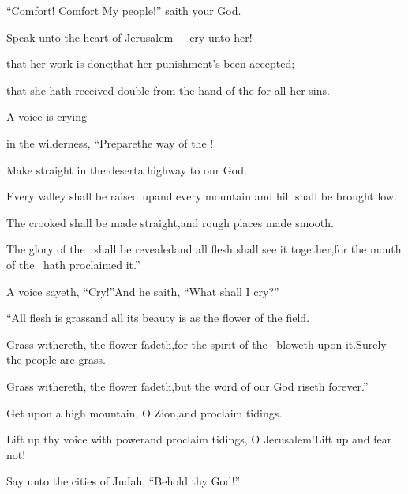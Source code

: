 
\begin{inparaenum}
  \pa{} ``Comfort! Comfort My people!''%
  \pa{}saith your God.%

  \pa{} Speak unto the heart of Jerusalem~---\pa{}cry unto her!~---%

  \pa{}that her work is done;\pa{}that her punishment's been accepted;%

  \pa{}that she hath received double from the hand of the \lord\pa{}for all her sins.%

  \pb{} A voice is crying%

  \pb{}in the wilderness, ``Prepare\pa{}the way of the \lord!%

  \pb{}Make straight in the desert\pa{}a highway to our God.%

  \pb{} Every valley shall be raised up\pa{}and every mountain and hill shall be brought low.%

  \pb{}The crooked shall be made straight,\pa{}and rough places made smooth.%

  \pb{} The glory of the \lord\ shall be revealed\pa{}and all flesh shall see it together,\pa{}for the mouth of the \lord\ hath proclaimed it.''%

  \pa{} A voice sayeth, ``Cry!''\pa{}And he saith, ``What shall I cry?''%

  \pa{}``All flesh is grass\pa{}and all its beauty is as the flower of the field.%

  \pa{} Grass withereth, the flower fadeth,\pa{}for the spirit of the \lord\ bloweth upon it.\pa{}Surely the people are grass.%

  \pa{} Grass withereth, the flower fadeth,\pa{}but the word of our God riseth forever.''%

  \pb{} Get upon a high mountain, O Zion,\pa{}and proclaim tidings.%

  \pb{}Lift up thy voice with power\pa{}and proclaim tidings, O Jerusalem!\pa{}Lift up and fear not!%

  \pb{}Say unto the cities of Judah, ``Behold thy God!''%


\end{inparaenum}
